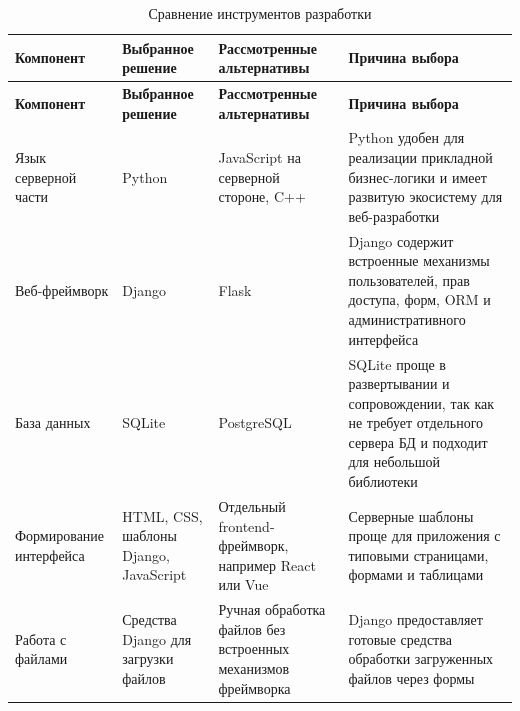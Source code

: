 {
\coursetablesetup
\setlength{\LTleft}{0pt}
\setlength{\LTright}{0pt}

\begin{longtable}{|
p{}|
p{}|
p{}|
p{}|}
    \caption{Сравнение инструментов разработки}
    \label{tab:dev_tools} \\

    \hline
    \textbf{Компонент} &
    \textbf{Выбранное решение} &
    \textbf{Рассмотренные альтернативы} &
    \textbf{Причина выбора} \\ \hline
    \endfirsthead

    \tabcont{\ref{tab:dev_tools}}
    \textbf{Компонент} &
    \textbf{Выбранное решение} &
    \textbf{Рассмотренные альтернативы} &
    \textbf{Причина выбора} \\ \hline
    \endhead

    \hline
    \endfoot

    Язык серверной части &
    Python &
    JavaScript на серверной стороне, C++ &
    Python удобен для реализации прикладной бизнес-логики и имеет развитую экосистему для веб-разработки \\ \hline

    Веб-фреймворк &
    Django &
    Flask &
    Django содержит встроенные механизмы пользователей, прав доступа, форм, ORM и административного интерфейса \\ \hline

    База данных &
    SQLite &
    PostgreSQL &
    SQLite проще в развертывании и сопровождении, так как не требует отдельного сервера БД и подходит для небольшой библиотеки \\ \hline

    Формирование интерфейса &
    HTML, CSS, шаблоны Django, JavaScript &
    Отдельный frontend-фреймворк, например React или Vue &
    Серверные шаблоны проще для приложения с типовыми страницами, формами и таблицами \\ \hline

    Работа с файлами &
    Средства Django для загрузки файлов &
    Ручная обработка файлов без встроенных механизмов фреймворка &
    Django предоставляет готовые средства обработки загруженных файлов через формы \\ \hline
\end{longtable}
}

